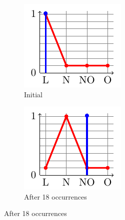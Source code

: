 \begin{figure}\centering
\begin{subfigure}[t]{.15\linewidth}
\includegraphics[width=\linewidth]{plot_tikz/speed1.pdf}
\caption{Initial}
\label{fig:a}
\end{subfigure}
\begin{subfigure}[t]{.15\linewidth}
\includegraphics[width=\linewidth]{plot_tikz/speed28CONF.pdf}
\caption{After 18 occurrences}
\label{fig:b}
\end{subfigure}

\end{figure}
